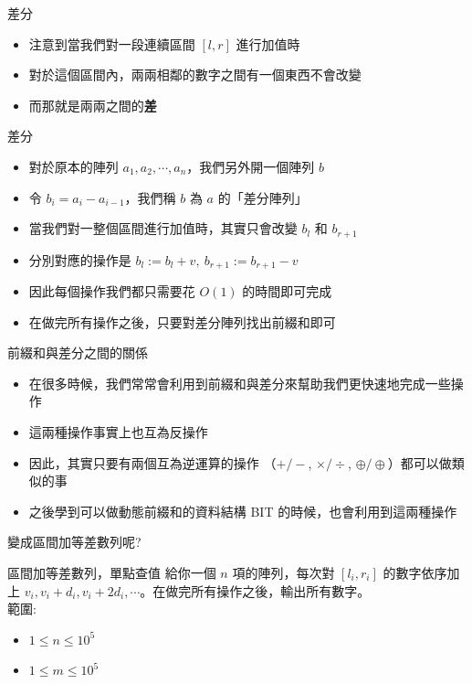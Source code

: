 \documentclass[aspectratio=169]{beamer}
\begin{document}
    \begin{frame}{差分}
        \begin{itemize}
            \item 注意到當我們對一段連續區間 $[l,r]$ 進行加值時
            \item 對於這個區間內，兩兩相鄰的數字之間有一個東西不會改變
            \item 而那就是兩兩之間的\textbf{差}
        \end{itemize}
    \end{frame}
    
    \begin{frame}{差分}
        \begin{itemize}
            \item 對於原本的陣列 $a_1,a_2,\cdots,a_n$，我們另外開一個陣列 $b$
            \item 令 $b_i = a_i - a_{i-1}$，我們稱 $b$ 為 $a$ 的「差分陣列」
            \item<2-> 當我們對一整個區間進行加值時，其實只會改變 $b_l$ 和 $b_{r+1}$
            \item<2-> 分別對應的操作是 $b_l := b_l+v, \ b_{r+1} := b_{r+1}-v$
            \item<2-> 因此每個操作我們都只需要花 $O(1)$ 的時間即可完成
            \item<3-> 在做完所有操作之後，只要對差分陣列找出前綴和即可
        \end{itemize}
    \end{frame}
    
    \begin{frame}{前綴和與差分之間的關係}
        \begin{itemize}
            \item 在很多時候，我們常常會利用到前綴和與差分來幫助我們更快速地完成一些操作
            \item 這兩種操作事實上也互為反操作
            \item 因此，其實只要有兩個互為逆運算的操作 （$+/-$, $\times/\div$, $\oplus/\oplus$）都可以做類似的事
            \item 之後學到可以做動態前綴和的資料結構 BIT 的時候，也會利用到這兩種操作
        \end{itemize}
    \end{frame}
    
    \begin{frame}{變成區間加等差數列呢?}
        \begin{block}{區間加等差數列，單點查值}
            給你一個 $n$ 項的陣列，每次對 $[l_i,r_i]$ 的數字依序加上 $v_i, v_i+d_i, v_i+2d_i, \cdots$。在做完所有操作之後，輸出所有數字。 \\
            \vspace{5mm}
            範圍: 
            \begin{itemize}
                \item $1 \le n \le 10^5$
                \item $1 \le m \le 10^5$
            \end{itemize}
        \end{block}
    \end{frame}
    
\end{document}
